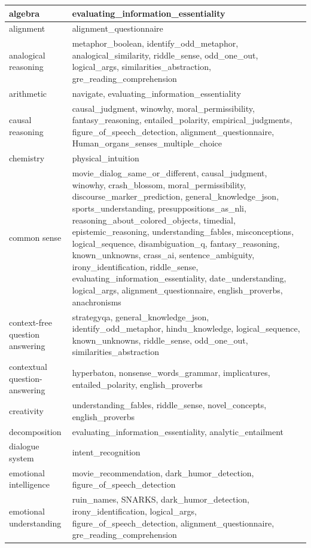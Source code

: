 \documentclass[11pt, a4paper, logo, internal, copyright, nonumbering]{deepmind}
\begin{document}
\begin{xltabular}{\textwidth}{X|X}
algebra & evaluating\_information\_essentiality \\ \hline
alignment & alignment\_questionnaire \\ \hline
analogical reasoning & metaphor\_boolean, identify\_odd\_metaphor, analogical\_similarity, riddle\_sense, odd\_one\_out, logical\_args, similarities\_abstraction, gre\_reading\_comprehension \\ \hline
arithmetic & navigate, evaluating\_information\_essentiality \\ \hline
causal reasoning & causal\_judgment, winowhy, moral\_permissibility, fantasy\_reasoning, entailed\_polarity, empirical\_judgments, figure\_of\_speech\_detection, alignment\_questionnaire, Human\_organs\_senses\_multiple\_choice \\ \hline
chemistry & physical\_intuition \\ \hline
common sense & movie\_dialog\_same\_or\_different, causal\_judgment, winowhy, crash\_blossom, moral\_permissibility, discourse\_marker\_prediction, general\_knowledge\_json, sports\_understanding, presuppositions\_as\_nli, reasoning\_about\_colored\_objects, timedial, epistemic\_reasoning, understanding\_fables, misconceptions, logical\_sequence, disambiguation\_q, fantasy\_reasoning, known\_unknowns, crass\_ai, sentence\_ambiguity, irony\_identification, riddle\_sense, evaluating\_information\_essentiality, date\_understanding, logical\_args, alignment\_questionnaire, english\_proverbs, anachronisms \\ \hline
context-free question answering & strategyqa, general\_knowledge\_json, identify\_odd\_metaphor, hindu\_knowledge, logical\_sequence, known\_unknowns, riddle\_sense, odd\_one\_out, similarities\_abstraction \\ \hline
contextual question-answering & hyperbaton, nonsense\_words\_grammar, implicatures, entailed\_polarity, english\_proverbs \\ \hline
creativity & understanding\_fables, riddle\_sense, novel\_concepts, english\_proverbs \\ \hline
decomposition & evaluating\_information\_essentiality, analytic\_entailment \\ \hline
dialogue system & intent\_recognition \\ \hline
emotional intelligence & movie\_recommendation, dark\_humor\_detection, figure\_of\_speech\_detection \\ \hline
emotional understanding & ruin\_names, SNARKS, dark\_humor\_detection, irony\_identification, logical\_args, figure\_of\_speech\_detection, alignment\_questionnaire, gre\_reading\_comprehension \\ \hline

\end{xltabular}
\end{document}

